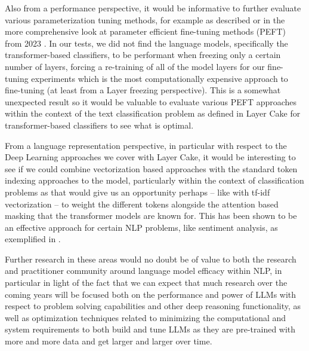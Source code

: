 \documentclass[final]{clv2025}
\begin{document}
Also from a performance perspective, it would be informative to further evaluate various parameterization tuning methods, for example as described \cite{lee} or in the more comprehensive look at parameter efficient fine-tuning methods (PEFT) from 2023 \cite{articleding}. In our tests, we did not find the language models, specifically the transformer-based classifiers, to be performant when freezing only a certain number of layers, forcing a re-training of all of the model layers for our fine-tuning experiments which is the most computationally expensive approach to fine-tuning (at least from a Layer freezing perspective). This is a somewhat unexpected result so it would be valuable to evaluate various PEFT approaches within the context of the text classification problem as defined in Layer Cake for transformer-based classifiers to see what is optimal. 

From a language representation perspective, in particular with respect to the Deep Learning approaches we cover with Layer Cake, it would be interesting to see if we could combine vectorization based approaches with the standard token indexing approaches to the model, particularly within the context of classification problems as that would give us an opportunity perhaps – like with tf-idf vectorization – to weight the different tokens alongside the attention based masking that the transformer models are known for. This has been shown to be an effective approach for certain NLP problems, like sentiment analysis, as exemplified in \cite{liang2022research} \cite{zhao2022research} \cite{kamyab2021attention}.

Further research in these areas would no doubt be of value to both the research and practitioner community around language model efficacy within NLP, in particular in light of the fact that we can expect that much research over the coming years will be focused both on the performance and power of LLMs with respect to problem solving capabilities and other deep reasoning functionality, as well as optimization techniques related to minimizing the computational and system requirements to both build and tune LLMs as they are pre-trained with more and more data and get larger and larger over time.




\end{document}
